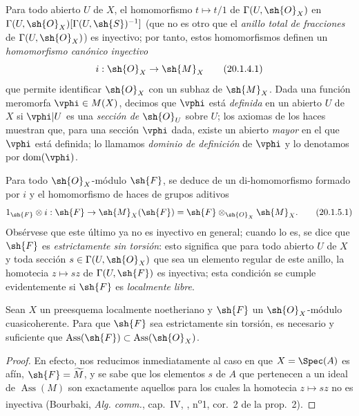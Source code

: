 \begin{env}[20.1.4]
\label{IV.20.1.4}
Para todo abierto $U$ de $X$, el homomorfismo $t\mapsto t/1$ de $\Gamma(U,\sh{O}_X)$ en $\Gamma(U,\sh{O}_X)[\Gamma(U,\sh{S})^{-1}]$ (que no es otro que el \emph{anillo total de fracciones} de
$\Gamma(U,\sh{O}_X)$) es inyectivo; por tanto, estos homomorfismos definen un \emph{homomorfismo canónico inyectivo}
\[
\label{IV.20.1.4.1}
  i:\sh{O}_X\to\sh{M}_X
  \tag{20.1.4.1}
\]
que permite identificar $\sh{O}_X$ con un subhaz de $\sh{M}_X$.
Dada una función meromorfa $\vphi\in M(X)$, decimos que $\vphi$ está \emph{definida} en un abierto $U$ de $X$ si $\vphi|U$ es una \emph{sección de $\sh{O}_U$} sobre $U$; los axiomas de los haces muestran que, para una sección $\vphi$ dada, existe un abierto \emph{mayor} en el que $\vphi$ está definida; lo llamamos \emph{dominio de definición} de $\vphi$ y lo denotamos por $\operatorname{dom}(\vphi)$.
\end{env}

\begin{env}[20.1.5]
\label{IV.20.1.5}
Para todo $\sh{O}_X$-módulo $\sh{F}$, se deduce de  un di-homomorfismo formado por $i$ y el homomorfismo de haces de grupos aditivos
\[
\label{IV.20.1.5.1}
  1_{\sh{F}}\otimes i:\sh{F}\to\sh{M}_X(\sh{F})=\sh{F}\otimes_{\sh{O}_X}\sh{M}_X.
  \tag{20.1.5.1}
\]
Obsérvese que este último ya no es inyectivo en general; cuando lo es, se dice que $\sh{F}$ es \emph{estrictamente sin torsión}: esto significa que para todo abierto $U$ de $X$ y toda sección $s\in\Gamma(U,\sh{O}_X)$ que sea un elemento regular de este anillo, la homotecia $z\mapsto sz$ de $\Gamma(U,\sh{F})$ es inyectiva; esta condición se cumple evidentemente si $\sh{F}$ es \emph{localmente libre}.
\end{env}

\begin{proposition}[20.1.6]
\label{IV.20.1.6}
Sean $X$ un preesquema localmente noetheriano y $\sh{F}$ un $\sh{O}_X$-módulo cuasicoherente.
Para que $\sh{F}$ sea estrictamente sin torsión, es necesario y suficiente que $\operatorname{Ass}(\sh{F})\subset\operatorname{Ass}(\sh{O}_X)$.
\end{proposition}

\begin{proof}
En efecto, nos reducimos inmediatamente al caso en que $X=\Spec(A)$ es afín, $\sh{F}=\widetilde M$, y se sabe que los elementos $s$ de $A$ que pertenecen a un ideal de $\operatorname{Ass}(M)$ son exactamente aquellos para los cuales la homotecia $z\mapsto sz$ no es inyectiva (Bourbaki, \emph{Alg. comm.}, cap.~IV, , n\textsuperscript{o}1, cor.~2 de la prop.~2).
\end{proof}

